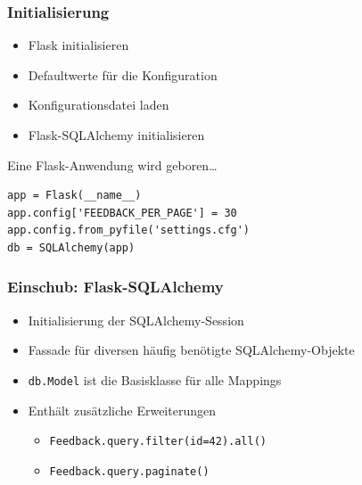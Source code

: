 \documentclass{beamer}
\begin{document}
\begin{frame}[fragile]
  \frametitle{Initialisierung}
  \begin{itemize}
    \item Flask initialisieren
    \item Defaultwerte für die Konfiguration
    \item Konfigurationsdatei laden
    \item Flask-SQLAlchemy initialisieren
  \end{itemize}
  \begin{exampleblock}{Eine Flask-Anwendung wird geboren\ldots}
    \begin{lstlisting}
app = Flask(__name__)
app.config['FEEDBACK_PER_PAGE'] = 30
app.config.from_pyfile('settings.cfg')
db = SQLAlchemy(app)
    \end{lstlisting}
  \end{exampleblock}
\end{frame}

\begin{frame}
  \frametitle{Einschub: Flask-SQLAlchemy}
  \begin{itemize}
    \item Initialisierung der SQLAlchemy-Session
    \item Fassade für diversen häufig benötigte SQLAlchemy-Objekte
    \item \lstinline{db.Model} ist die Basisklasse für alle Mappings
    \item Enthält zusätzliche Erweiterungen
      \begin{itemize}
        \item \lstinline{Feedback.query.filter(id=42).all()}
        \item \lstinline{Feedback.query.paginate()}
      \end{itemize}
  \end{itemize}
\end{frame}

\end{document}
